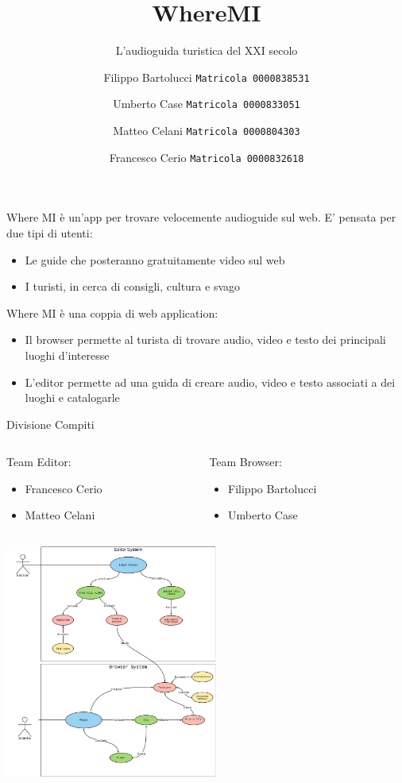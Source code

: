 \documentclass{beamer}
\title{WhereMI}
\subtitle{L'audioguida turistica del XXI secolo}
\author{
  Filippo Bartolucci
  \texttt{Matricola 0000838531}\\
  \and
  Umberto Case
  \texttt{Matricola 0000833051}\\
    \and
  Matteo Celani
  \texttt{Matricola 0000804303}\\
    \and
  Francesco Cerio
  \texttt{Matricola 0000832618}
 }
\institute{Università di Bologna}
\date{}
\begin{document}
\begin{frame}
\titlepage
\end{frame}

\begin{frame}
Where MI è un'app per trovare velocemente audioguide sul web. E' pensata per due tipi di utenti:
\begin{itemize}
  \item Le guide che posteranno gratuitamente video sul web
  \item I turisti, in cerca di consigli, cultura e svago
\end{itemize}
Where MI è una coppia di web application:
\begin{itemize}
  \item Il browser permette al turista di trovare audio, video e testo dei principali luoghi d'interesse
  \item L'editor permette ad una guida di creare audio, video e testo associati a dei luoghi e catalogarle
\end{itemize}
\vspace{0.2cm}
\centering Divisione Compiti
\vspace{0.2cm}
  \begin{columns}
    \begin{column}{.48\textwidth} %
    Team Editor:
 \begin{itemize}
  \item Francesco Cerio
  \item Matteo Celani
\end{itemize}
    \end{column}
    \hfill
    \begin{column}{.48 \textwidth}
    Team Browser:
  \begin{itemize}
  \item Filippo Bartolucci
  \item Umberto Case
\end{itemize}
    \end{column}
  \end{columns}
\end{frame}

\begin{frame}
	\centering \includegraphics[width=7cm]{Images/UML/UML2}
\end{frame}
\end{document}
